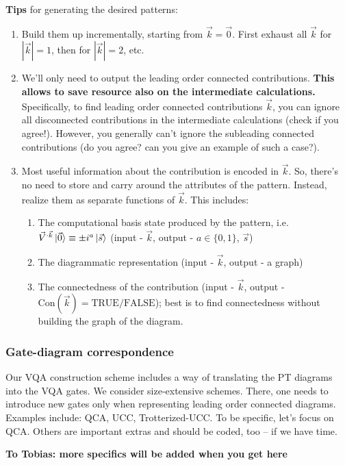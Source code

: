 \documentclass[10pt, a4paper]{article}
\begin{document}
\textbf{Tips} for generating the desired patterns:
\begin{enumerate}
\item Build them up incrementally, starting from $\vec{k}=\vec{0}$. First exhaust all $\vec{k}$ for $|\vec{k}|=1$, then for $|\vec{k}|=2$, etc.
\item We'll only need to output the leading order connected contributions. \textbf{This allows to save resource also on the intermediate calculations.} Specifically, to find leading order connected contributions $\vec{k}$, you can ignore all disconnected contributions in the intermediate calculations (check if you agree!). However, you generally can't ignore the subleading connected contributions (do you agree? can you give an example of such a case?).
\item Most useful information about the contribution is encoded in $\vec{k}$. So, there's no need to store and carry around the attributes of the pattern. Instead, realize them as separate functions of $\vec{k}$. This includes:
\begin{enumerate}
\item The computational basis state produced by the pattern, i.e. $\vec{V}^{\cdot\vec{k}}\ket{\vec{0}}\equiv\pm i^a\ket{\vec{s}}$ (input - $\vec{k}$, output - $a\in\{0,1\}$, $\vec{s}$) 
\item The diagrammatic representation (input - $\vec{k}$, output - a graph)
\item The connectedness of the contribution (input - $\vec{k}$, output - $\mathrm{Con}(\vec{k})=\mathrm{TRUE/FALSE}$); best is to find connectedness without building the graph of the diagram.
\end{enumerate}
\end{enumerate}

\subsubsection*{Gate-diagram correspondence}

Our VQA construction scheme includes a way of translating the PT diagrams into the VQA gates. We consider size-extensive schemes. There, one needs to introduce new gates only when representing leading order connected diagrams. Examples include: QCA, UCC, Trotterized-UCC. To be specific, let's focus on QCA. Others are important extras and should be coded, too -- if we have time.

\textbf{To Tobias: more specifics will be added when you get here}
\end{document}
